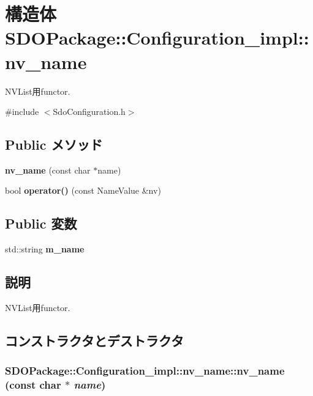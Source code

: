 \section{構造体 SDOPackage::Configuration\_\-impl::nv\_\-name}
\label{structSDOPackage_1_1Configuration__impl_1_1nv__name}


NVList用functor.  




{\ttfamily \#include $<$SdoConfiguration.h$>$}

\subsection*{Public メソッド}
\begin{DoxyCompactItemize}
\item 
{\bf nv\_\-name} (const char $\ast$name)
\item 
bool {\bf operator()} (const NameValue \&nv)
\end{DoxyCompactItemize}
\subsection*{Public 変数}
\begin{DoxyCompactItemize}
\item 
std::string {\bf m\_\-name}
\end{DoxyCompactItemize}


\subsection{説明}
NVList用functor. 

\subsection{コンストラクタとデストラクタ}
\subsubsection[{nv\_\-name}]{\setlength{\rightskip}{0pt plus 5cm}SDOPackage::Configuration\_\-impl::nv\_\-name::nv\_\-name (const char $\ast$ {\em name})\hspace{0.3cm}{\ttfamily  [inline]}}\label{structSDOPackage_1_1Configuration__impl_1_1nv__name_aa16eb582dbd8ab2c40af6c6fc950fffb}


